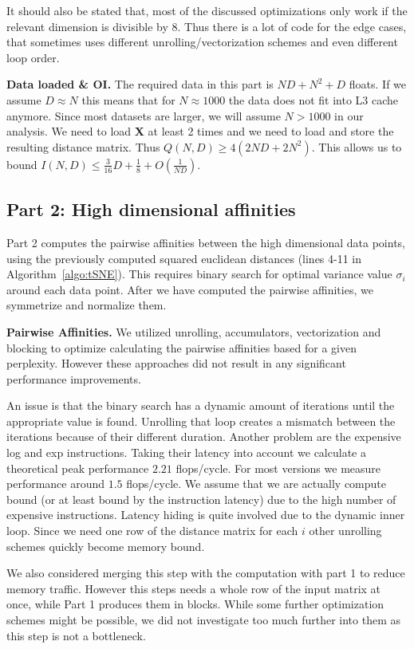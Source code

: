 \documentclass[letterpaper]{article}
\newcommand{\mypar}[1]{{\bf #1.}}
\begin{document}
It should also be stated that, most of the discussed optimizations only work if the relevant dimension is divisible by 8. Thus there is a lot of code for the edge cases, that sometimes uses different unrolling/vectorization schemes and even different loop order.

\mypar{Data loaded \& OI}
The required data in this part is $ND + N^2 + D$ floats. If we assume $D \approx N$ this means that for $N \approx 1000$ the data does not fit into L3 cache anymore. Since most datasets are larger, we will assume $N > 1000$ in our analysis. We need to load \textbf{X} at least 2 times and we need to load and store the resulting distance matrix. Thus $Q(N,D) \geq 4(2 ND +  2N^2)$. This allows us to bound $I(N,D) \leq \frac{3}{16}D + \frac{1}{8} + O(\frac{1}{ND})$.

\subsection{Part 2: High dimensional affinities}
Part 2 computes the pairwise affinities between the high dimensional data points, using the previously computed squared euclidean distances (lines 4-11 in Algorithm~\ref{algo:tSNE}). This requires binary search for optimal variance value $\sigma_i$ around each data point. After we have computed the pairwise affinities, we symmetrize and normalize them.

\mypar{Pairwise Affinities}
We utilized unrolling, accumulators, vectorization and blocking to optimize calculating the pairwise affinities based for a given perplexity. However these approaches did not result in any significant performance improvements.

An issue is that the binary search has a dynamic amount of iterations until the appropriate value is found. Unrolling that loop creates a mismatch between the iterations because of their different duration.
Another problem are the expensive log and exp instructions. Taking their latency into account we calculate a theoretical peak performance $2.21$ flops/cycle. For most versions we measure performance around $1.5$ flops/cycle. We assume that we are actually compute bound (or at least bound by the instruction latency) due to the high number of expensive instructions. Latency hiding is quite involved due to the dynamic inner loop. Since we need one row of the distance matrix for each $i$ other unrolling schemes quickly become memory bound.

We also considered merging this step with the computation with part 1 to reduce memory traffic. However this steps needs a whole row of the input matrix at once, while Part 1 produces them in blocks. While some further optimization schemes might be possible, we did not investigate too much further into them as this step is not a bottleneck.
\end{document}
